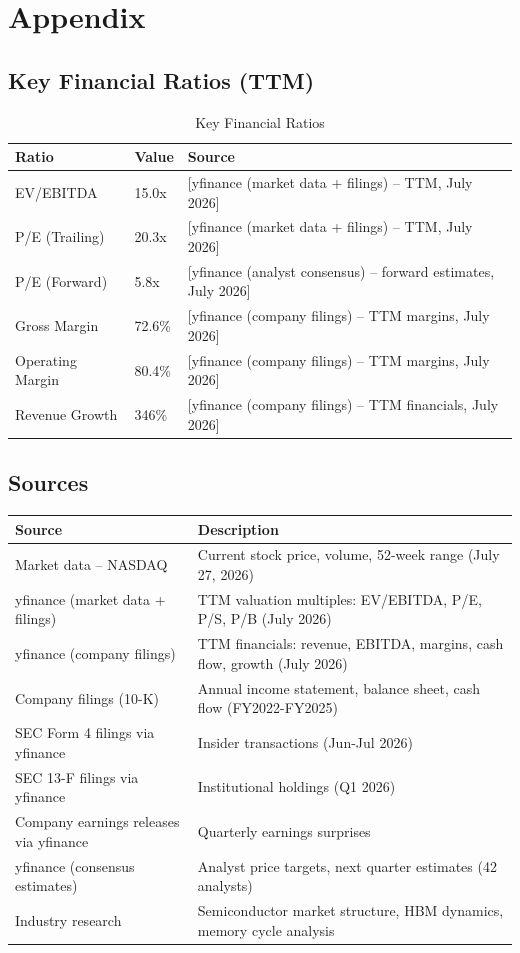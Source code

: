 \documentclass[11pt,a4paper]{report}
\begin{document}
{%
\chapter{Appendix}

\section{Key Financial Ratios (TTM)}
\begin{table}[H]
\centering
\caption{Key Financial Ratios}
\begin{tabularx}{\textwidth}{lC{3cm}X}
\toprule
\textbf{Ratio} & \textbf{Value} & \textbf{Source} \\
\midrule
EV/EBITDA & 15.0x & [yfinance (market data + filings) -- TTM, July 2026] \\
P/E (Trailing) & 20.3x & [yfinance (market data + filings) -- TTM, July 2026] \\
P/E (Forward) & 5.8x & [yfinance (analyst consensus) -- forward estimates, July 2026] \\
Gross Margin & 72.6\% & [yfinance (company filings) -- TTM margins, July 2026] \\
Operating Margin & 80.4\% & [yfinance (company filings) -- TTM margins, July 2026] \\
Revenue Growth & 346\% & [yfinance (company filings) -- TTM financials, July 2026]
\bottomrule
\end{tabularx}
\end{table}

\section{Sources}
\begin{tabularx}{\textwidth}{lX}
\toprule
\textbf{Source} & \textbf{Description} \\
\midrule
Market data -- NASDAQ & Current stock price, volume, 52-week range (July 27, 2026) \\
yfinance (market data + filings) & TTM valuation multiples: EV/EBITDA, P/E, P/S, P/B (July 2026) \\
yfinance (company filings) & TTM financials: revenue, EBITDA, margins, cash flow, growth (July 2026) \\
Company filings (10-K) & Annual income statement, balance sheet, cash flow (FY2022-FY2025) \\
SEC Form 4 filings via yfinance & Insider transactions (Jun-Jul 2026) \\
SEC 13-F filings via yfinance & Institutional holdings (Q1 2026) \\
Company earnings releases via yfinance & Quarterly earnings surprises \\
yfinance (consensus estimates) & Analyst price targets, next quarter estimates (42 analysts) \\
Industry research & Semiconductor market structure, HBM dynamics, memory cycle analysis
\bottomrule
\end{tabularx}

}
\end{document}
